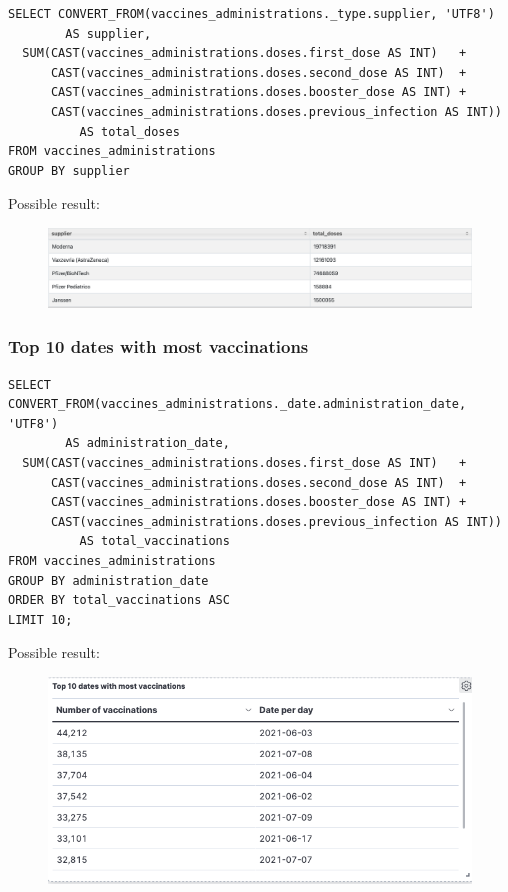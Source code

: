 \documentclass[12pt, a4paper]{article}
\begin{document}
\begin{tcolorbox}[fontupper=\scriptsize]
  \begin{verbatim}
SELECT CONVERT_FROM(vaccines_administrations._type.supplier, 'UTF8') 
        AS supplier,
  SUM(CAST(vaccines_administrations.doses.first_dose AS INT)   + 
      CAST(vaccines_administrations.doses.second_dose AS INT)  + 
      CAST(vaccines_administrations.doses.booster_dose AS INT) +
      CAST(vaccines_administrations.doses.previous_infection AS INT)) 
          AS total_doses
FROM vaccines_administrations
GROUP BY supplier
  \end{verbatim}
\end{tcolorbox}

\clearpage %

\noindent
Possible result:
\begin{figure}[ht]
  \centering
  \includegraphics[width=\linewidth]{hbase_query_2.png}
\end{figure}

\subsubsection{Top 10 dates with most vaccinations}

\begin{tcolorbox}[fontupper=\scriptsize]
  \begin{verbatim}
SELECT CONVERT_FROM(vaccines_administrations._date.administration_date, 'UTF8') 
        AS administration_date,
  SUM(CAST(vaccines_administrations.doses.first_dose AS INT)   + 
      CAST(vaccines_administrations.doses.second_dose AS INT)  + 
      CAST(vaccines_administrations.doses.booster_dose AS INT) +
      CAST(vaccines_administrations.doses.previous_infection AS INT)) 
          AS total_vaccinations
FROM vaccines_administrations
GROUP BY administration_date
ORDER BY total_vaccinations ASC
LIMIT 10;
  \end{verbatim}
\end{tcolorbox}

\noindent
Possible result:
\begin{figure}[ht]
  \centering
  \includegraphics[width=\linewidth]{hbase_query_3.png}
\end{figure}
\end{document}
